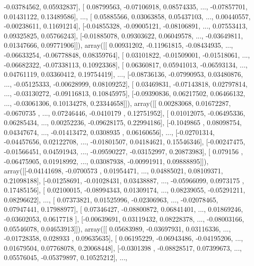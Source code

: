 \documentclass{article}
\begin{document}
        -0.03784562,  0.05932837],
       [ 0.08799563, -0.07106918,  0.08574335, ..., -0.07857701,
         0.01431122,  0.13489586],
       ..., 
       [ 0.05885566,  0.03063858,  0.05437103, ...,  0.00440557,
        -0.00238611,  0.11691214],
       [-0.04855328, -0.09005121, -0.08106891, ...,  0.07553413,
         0.09325825,  0.05766243],
       [-0.01885078,  0.09303622,  0.06049578, ..., -0.03649811,
         0.01347666,  0.09771906]]), array([[ 0.00931202, -0.11961815, -0.08434935, ..., -0.06633254,
        -0.06778848,  0.08359764],
       [ 0.03101822, -0.01509001, -0.01518061, ..., -0.06682322,
        -0.07338113,  0.10923368],
       [ 0.06360817,  0.05941013, -0.06593134, ...,  0.04761119,
         0.03360412,  0.19754419],
       ..., 
       [-0.08736136, -0.07990953,  0.03480876, ..., -0.05125333,
        -0.00628999,  0.08109252],
       [ 0.03469831, -0.07143818,  0.02797814, ..., -0.03130272,
        -0.09116813,  0.10845975],
       [-0.09390836,  0.06217502,  0.06466132, ..., -0.03061306,
         0.10134278,  0.23344658]]), array([[ 0.00283068,  0.01672287, -0.0670735 , ...,  0.07246446,
        -0.0410179 ,  0.12751952],
       [ 0.01012075, -0.06495336,  0.06285434, ...,  0.00252236,
        -0.09628175,  0.22994186],
       [-0.1049865 ,  0.08098754,  0.04347674, ..., -0.01413472,
         0.0308935 ,  0.06160656],
       ..., 
       [-0.02701314, -0.04457656,  0.02122708, ..., -0.01801507,
         0.04184621,  0.15546346],
       [-0.00247475, -0.01566451,  0.04591943, ..., -0.09590227,
        -0.03152997,  0.20873983],
       [ 0.079156  , -0.06475905,  0.01918992, ...,  0.03087938,
        -0.00991911,  0.09888895]]), array([[-0.04141698, -0.0700573 ,  0.01954471, ...,  0.04885021,
         0.08109371,  0.21098188],
       [-0.01258691, -0.01028431,  0.03438887, ..., -0.05966099,
         0.0973175 ,  0.17485156],
       [ 0.02100015, -0.08994343,  0.01309174, ...,  0.08239055,
        -0.05291211,  0.08296622],
       ..., 
       [ 0.07373821,  0.01525996, -0.02306963, ..., -0.02078465,
         0.07947441,  0.17988977],
       [ 0.07346427, -0.08800872,  0.06841401, ...,  0.01869246,
        -0.03602053,  0.0617718 ],
       [-0.00639691,  0.03119432,  0.08228378, ..., -0.08003166,
         0.05546078,  0.04653913]]), array([[ 0.05683989, -0.03697931,  0.03116336, ..., -0.01728358,
         0.028933  ,  0.09635635],
       [ 0.06195229, -0.06943486, -0.04195206, ...,  0.01679504,
         0.07768078,  0.20068448],
       [-0.0301398 , -0.08828517,  0.07399673, ...,  0.05576045,
        -0.05379897,  0.10525212],
       ..., 
\end{document}
